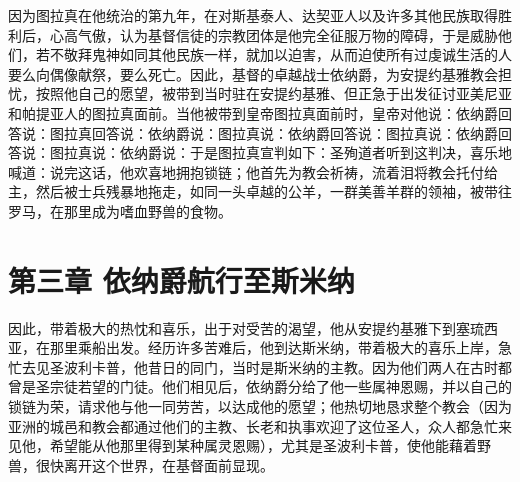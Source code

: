 因为图拉真在他统治的第九年，在对斯基泰人、达契亚人以及许多其他民族取得胜利后，心高气傲，认为基督信徒的宗教团体是他完全征服万物的障碍，于是威胁他们，若不敬拜鬼神如同其他民族一样，就加以迫害，从而迫使所有过虔诚生活的人要么向偶像献祭，要么死亡。因此，基督的卓越战士依纳爵，为安提约基雅教会担忧，按照他自己的愿望，被带到当时驻在安提约基雅、但正急于出发征讨亚美尼亚和帕提亚人的图拉真面前。当他被带到皇帝图拉真面前时，皇帝对他说：依纳爵回答说：图拉真回答说：依纳爵说：图拉真说：依纳爵回答说：图拉真说：依纳爵回答说：图拉真说：依纳爵说：于是图拉真宣判如下：圣殉道者听到这判决，喜乐地喊道：说完这话，他欢喜地拥抱锁链；他首先为教会祈祷，流着泪将教会托付给主，然后被士兵残暴地拖走，如同一头卓越的公羊，一群美善羊群的领袖，被带往罗马，在那里成为嗜血野兽的食物。\par


\section{第三章 依纳爵航行至斯米纳}

因此，带着极大的热忱和喜乐，出于对受苦的渴望，他从安提约基雅下到塞琉西亚，在那里乘船出发。经历许多苦难后，他到达斯米纳，带着极大的喜乐上岸，急忙去见圣波利卡普，他昔日的同门，当时是斯米纳的主教。因为他们两人在古时都曾是圣宗徒若望的门徒。他们相见后，依纳爵分给了他一些属神恩赐，并以自己的锁链为荣，请求他与他一同劳苦，以达成他的愿望；他热切地恳求整个教会（因为亚洲的城邑和教会都通过他们的主教、长老和执事欢迎了这位圣人，众人都急忙来见他，希望能从他那里得到某种属灵恩赐），尤其是圣波利卡普，使他能藉着野兽，很快离开这个世界，在基督面前显现。\par

